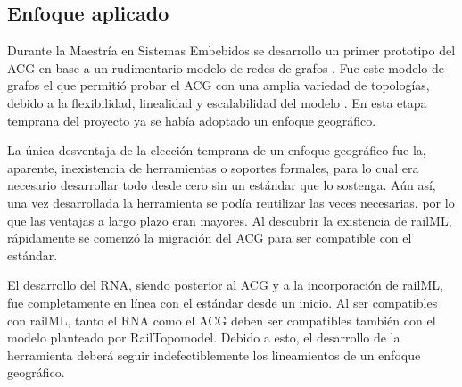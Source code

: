 \subsection{Enfoque aplicado}

    Durante la Maestría en Sistemas Embebidos se desarrollo un primer prototipo del ACG en base a un rudimentario modelo de redes de grafos \cite{Paper_206}. Fue este modelo de grafos el que permitió probar el ACG con una amplia variedad de topologías, debido a la flexibilidad, linealidad y escalabilidad del modelo \cite{Paper_109,Paper_149,Paper_150}. En esta etapa temprana del proyecto ya se había adoptado un enfoque geográfico.

    La única desventaja de la elección temprana de un enfoque geográfico fue la, aparente, inexistencia de herramientas o soportes formales, para lo cual era necesario desarrollar todo desde cero sin un estándar que lo sostenga. Aún así, una vez desarrollada la herramienta se podía reutilizar las veces necesarias, por lo que las ventajas a largo plazo eran mayores. Al descubrir la existencia de railML, rápidamente se comenzó la migración del ACG para ser compatible con el estándar.

    El desarrollo del RNA, siendo posterior al ACG y a la incorporación de railML, fue completamente en línea con el estándar desde un inicio. Al ser compatibles con railML, tanto el RNA como el ACG deben ser compatibles también con el modelo planteado por RailTopomodel. Debido a esto, el desarrollo de la herramienta deberá seguir indefectiblemente los lineamientos de un enfoque geográfico. 